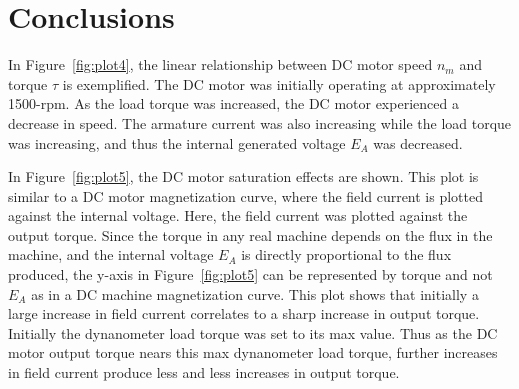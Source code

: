\documentclass{article}
\begin{document}
\section*{Conclusions}

In Figure~\ref{fig:plot4}, the linear relationship between DC motor speed $n_m$
and torque $\tau$ is exemplified.  The DC motor was initially operating at
approximately 1500-rpm. As the load torque was increased, the DC motor
experienced a decrease in speed. The armature current was also increasing while
the load torque was increasing, and thus the internal generated voltage $E_A$
was decreased.

In Figure~\ref{fig:plot5}, the DC motor saturation effects are shown. This plot
is similar to a DC motor magnetization curve, where the field current is
plotted against the internal voltage. Here, the field current was plotted
against the output torque. Since the torque in any real machine depends on the
flux in the machine, and the internal voltage $E_A$ is directly proportional to
the flux produced, the y-axis in Figure~\ref{fig:plot5} can be represented by
torque and not $E_A$ as in a DC machine magnetization curve. This plot shows
that initially a large increase in field current correlates to a sharp increase
in output torque. Initially the dynanometer load torque was set to its max
value. Thus as the DC motor output torque nears this max dynanometer load
torque, further increases in field current produce less and less increases in
output torque.
\end{document}

